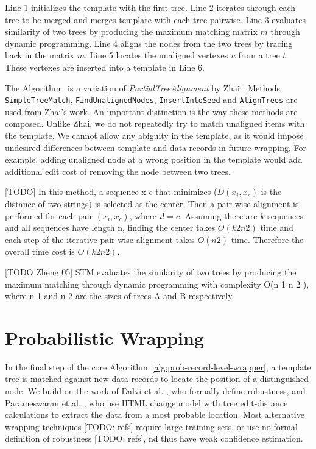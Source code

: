 Line 1 initializes the template with the first tree. Line 2 iterates through each tree to be merged and merges template with each tree pairwise. Line 3 evaluates similarity of two trees by producing the maximum matching matrix $m$ through dynamic programming. Line 4 aligns the nodes from the two trees by tracing back in the matrix $m$. Line 5 locates the unaligned vertexes $u$ from a tree $t$. These vertexes are inserted into a template in Line 6.

The Algorithm~\cite{alg:merging-data-records} is a variation of \emph{PartialTreeAlignment} by Zhai \cite{zhai2005a}. Methods \texttt{SimpleTreeMatch}, \texttt{FindUnalignedNodes}, \texttt{InsertIntoSeed} and \texttt{AlignTrees} are used from Zhai's work. An important distinction is the way these methods are composed. Unlike Zhai, we do not repeatedly try to match unaligned items with the template. We cannot allow any abiguity in the template, as it would impose undesired differences between template and data records in future wrapping. For example, adding unaligned node at a wrong position in the template would add additional edit cost of removing the node between two trees.

[TODO]
In this method, a sequence x c that minimizes ($D(x_i, x_c)$ is the distance of two strings)
is selected as the center. Then a pair-wise alignment is performed
for each pair $(x_i, x_c)$, where $i != c$. Assuming there are $k$ sequences
and all sequences have length n, finding the center takes $O(k 2 n 2 )$
time and each step of the iterative pair-wise alignment takes $O(n 2 )$
time. Therefore the overall time cost is $O(k 2 n 2 )$.

[TODO Zheng 05] STM evaluates the similarity of two trees by producing the maximum matching through dynamic programming with complexity O(n 1 n 2 ), where n 1 and n 2 are the sizes of trees A and B respectively.


\section{Probabilistic Wrapping}

In the final step of the core Algorithm~\ref{alg:prob-record-level-wrapper}, a template tree is matched against new data records to locate the position of a distinguished node. We build on the work of Dalvi et al. \cite{dalvi2009a}, who formally define robustness, and Parameswaran et al. \cite{DBLP:journals/pvldb/ParameswaranDGR11}, who use HTML change model with tree edit-distance calculations to extract the data from a most probable location. Most alternative wrapping techniques [TODO: refs] require large training sets, or use no formal definition of robustness [TODO: refs], 
nd thus have weak confidence estimation.


